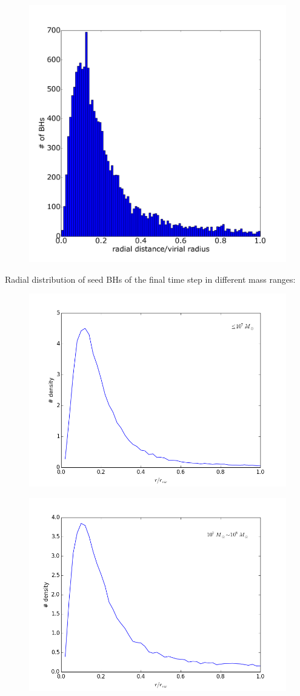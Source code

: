 \documentclass[useAMS,usenatbib]{mn2e}
\begin{document}
\begin{figure}
  \centering
  \includegraphics[width=0.8\columnwidth]{rad_dist22.png}
\end{figure}
Radial distribution of seed BHs of the final time step in different mass ranges:
\begin{figure}
  \centering
  \includegraphics[width=0.8\columnwidth]{radist_mass7.png}
\end{figure}

\begin{figure}
  \centering
  \includegraphics[width=0.8\columnwidth]{radist_mass8.png}
\end{figure}
\end{document}
